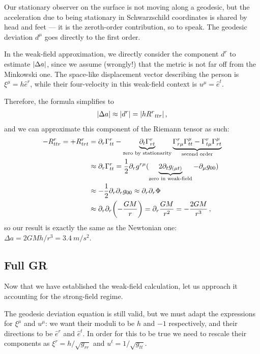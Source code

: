 \documentclass[main.tex]{subfiles}
\begin{document}
Our stationary observer on the surface is not moving along a geodesic, but the acceleration due to being stationary in Schwarzschild coordinates is shared by head and feet --- it is the zeroth-order contribution, so to speak. 
The geodesic deviation \(d^{\mu }\) goes directly to the first order. 

In the weak-field approximation, we directly consider the component \(d^{r}\) to estimate \(\abs{\Delta a}\), since we assume (wrongly!) that the metric is not far off from the Minkowski one.
The space-like displacement vector describing the person is \(\xi^{\mu } = h \hat{e}^{r}\), while their four-velocity in this weak-field context is \(u^{\mu } = \hat{e}^{t}\). 

Therefore, the formula simplifies to 
%
\begin{align}
\abs{\Delta a} \approx \abs{d^{r}} = \abs{h R^{r}{}_{ttr} }
\,,
\end{align}
%
and we can approximate this component of the Riemann tensor as such: 
%
\begin{align}
-R^{r}_{ttr} =
+R^{r}_{trt} &= \partial_{r} \Gamma^{r}_{tt} - \underbrace{\partial_t \Gamma^{r}_{rt}}_{\text{zero by stationarity}}
\underbrace{\Gamma^{r}_{r \mu } \Gamma^{\mu }_{tt} - \Gamma^{r}_{t \mu } \Gamma^{\mu}_{r t}}_{\text{second order}}  \\
&\approx \partial_{r} \Gamma^{r}_{tt} = \frac{1}{2} \partial_{r} g^{r \mu } (\underbrace{2\partial_{t} g_{(\mu t)}}_{\text{zero in weak-field}}  - \partial_{\mu } g_{00})  \\
&\approx - \frac{1}{2} \partial_{r} \partial_{r} g_{00} 
\approx \partial_{r} \partial_{r} \Phi  \\
&\approx \partial_{r} \partial_{r} \qty(- \frac{GM}{r}) = \partial_{r} \frac{GM}{r^2} = - \frac{2GM}{r^3}
\,,
\end{align}
%
so our result is exactly the same as the Newtonian one: \(\Delta a = 2GM h / r^3 = \SI{3.4}{m / s^2}\). 

\subsection{Full GR}

Now that we have established the weak-field calculation, let us approach it accounting for the strong-field regime. 

The geodesic deviation equation is still valid, but we must adapt the expressions for \(\xi^{\mu }\) and \(u^{\mu }\): 
we want their moduli to be \(h\) and \(-1\) respectively, and their directions to be \(\hat{e}^{r} \) and \(\hat{e}^{t}\).
In order for this to be true we need to rescale their components as \(\xi^{r} = h / \sqrt{g_{rr}}\) and \(u^{t} = 1/\sqrt{g_{tt}}\). 
\end{document}
